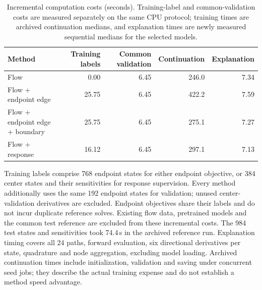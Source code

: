 \begin{table}[t]\centering\small
\caption{Incremental computation costs (seconds). Training-label and common-validation costs are measured separately on the same CPU protocol; training times are archived continuation medians, and explanation times are newly measured sequential medians for the selected models.}
\label{tab:learning-costs}
\begin{tabular}{lrrrr}\toprule Method & Training labels & Common validation & Continuation & Explanation\\\midrule
Flow & 0.00 & 6.45 & 246.0 & 7.34\\
Flow + endpoint edge & 25.75 & 6.45 & 422.2 & 7.59\\
Flow + endpoint edge + boundary & 25.75 & 6.45 & 275.1 & 7.27\\
Flow + response & 16.12 & 6.45 & 297.1 & 7.13\\
\bottomrule\end{tabular}\end{table}
Training labels comprise 768 endpoint states for either endpoint objective, or 384 center states and their sensitivities for response supervision. Every method additionally uses the same 192 endpoint states for validation; unused center-validation derivatives are excluded. Endpoint objectives share their labels and do not incur duplicate reference solves. Existing flow data, pretrained models and the common test reference are excluded from these incremental costs. The 984 test states and sensitivities took 74.4\,s in the archived reference run. Explanation timing covers all 24 paths, forward evaluation, six directional derivatives per state, quadrature and node aggregation, excluding model loading. Archived continuation times include initialization, validation and saving under concurrent seed jobs; they describe the actual training expense and do not establish a method speed advantage.
